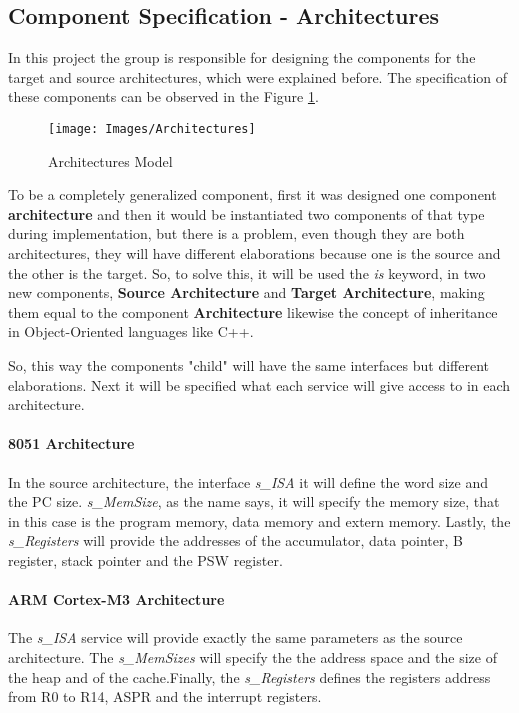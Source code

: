 	\subsection{Component Specification - Architectures}
	\par In this project the group is responsible for designing the components for the target and source architectures, which were explained before. The specification of these components can be observed in the Figure \ref{fig:Architectures}.
	\begin{figure}[h]
		\centering
		\texttt{[image: Images/Architectures]}
		\caption[Architectures Model]{Architectures Model}
		\label{fig:Architectures}
	\end{figure}
	\par To be a completely generalized component, first it was designed one component \textbf{architecture} and then it would be instantiated two components of that type during implementation, but there is a problem, even though they are both architectures, they will have different elaborations because one is the source and the other is the target. So, to solve this, it will be used the \textit{is} keyword, in two new components, \textbf{Source Architecture} and \textbf{Target Architecture}, making them equal to the component \textbf{Architecture} likewise the concept of inheritance in Object-Oriented languages like C++.
	\par So, this way the components "child" will have the same interfaces but different elaborations. Next it will be specified what each service will give access to in each architecture. 
	\paragraph{8051 Architecture} In the source architecture, the interface \textit{s\_ISA} it will define the word size and the PC size. \textit{s\_MemSize}, as the name says, it will specify the memory size, that in this case is the program memory, data memory and extern memory. Lastly, the \textit{s\_Registers} will provide the addresses of the accumulator, data pointer, B register, stack pointer and the PSW register.
	\paragraph{ARM Cortex-M3 Architecture}The \textit{s\_ISA} service will provide exactly the same parameters as the source architecture. The \textit{s\_MemSizes} will specify the the address space and the size of the heap and of the cache.Finally, the \textit{s\_Registers} defines the registers address from R0 to R14, ASPR and the interrupt registers.